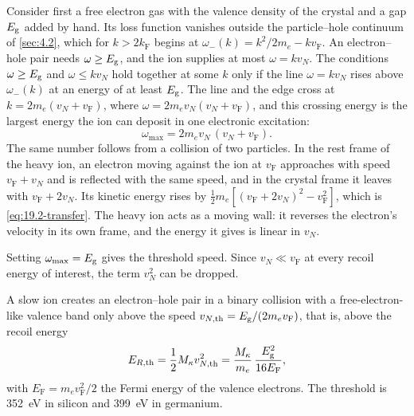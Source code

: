Consider first a free electron gas with the valence density of the crystal and a gap $E_{\mathrm{g}}$ added by hand. Its loss function vanishes outside the particle--hole continuum of \cref{sec:4.2}, which for $k > 2k_{\mathrm{F}}$ begins at $\omega_-(k) = k^2/2m_e - kv_{\mathrm{F}}$. An electron--hole pair needs $\omega \ge E_{\mathrm{g}}$, and the ion supplies at most $\omega = kv_N$. The conditions $\omega \ge E_{\mathrm{g}}$ and $\omega \le kv_N$ hold together at some $k$ only if the line $\omega = kv_N$ rises above $\omega_-(k)$ at an energy of at least $E_{\mathrm{g}}$. The line and the edge cross at $k = 2m_e(v_N + v_{\mathrm{F}})$, where $\omega = 2m_ev_N(v_N + v_{\mathrm{F}})$, and this crossing energy is the largest energy the ion can deposit in one electronic excitation:
\begin{equation}
  \omega_{\mathrm{max}} = 2m_e v_N\,(v_N + v_{\mathrm{F}}) .
  \label{eq:19.2-transfer}
\end{equation}
The same number follows from a collision of two particles. In the rest frame of the heavy ion, an electron moving against the ion at $v_{\mathrm{F}}$ approaches with speed $v_{\mathrm{F}} + v_N$ and is reflected with the same speed, and in the crystal frame it leaves with $v_{\mathrm{F}} + 2v_N$. Its kinetic energy rises by $\tfrac12 m_e[(v_{\mathrm{F}} + 2v_N)^2 - v_{\mathrm{F}}^2]$, which is \cref{eq:19.2-transfer}. The heavy ion acts as a moving wall: it reverses the electron's velocity in its own frame, and the energy it gives is linear in $v_N$.

Setting $\omega_{\mathrm{max}} = E_{\mathrm{g}}$ gives the threshold speed. Since $v_N \ll v_{\mathrm{F}}$ at every recoil energy of interest, the term $v_N^2$ can be dropped.

\begin{keyresult}
A slow ion creates an electron--hole pair in a binary collision with a free-electron-like valence band only above the speed $v_{N,\mathrm{th}} = E_{\mathrm{g}}/(2m_ev_{\mathrm{F}})$, that is, above the recoil energy
\begin{equation}
  E_{R,\mathrm{th}} = \frac12 M_\kappa v_{N,\mathrm{th}}^2 = \frac{M_\kappa}{m_e}\,\frac{E_{\mathrm{g}}^2}{16E_{\mathrm{F}}} ,
  \label{eq:19.2-Eth}
\end{equation}
with $E_{\mathrm{F}} = m_ev_{\mathrm{F}}^2/2$ the Fermi energy of the valence electrons. The threshold is \SI{352}{eV} in silicon and \SI{399}{eV} in germanium.
\end{keyresult}

